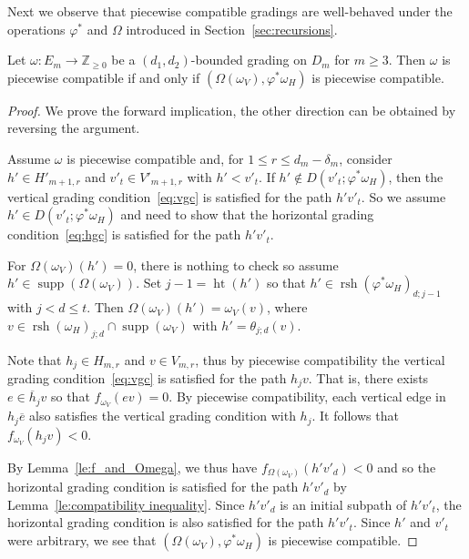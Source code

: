 \documentclass[ALCO,ThmDefs,Unicode,epreuves]{cedram}
\newcommand{\ZZ}{\mathbb{Z}}
\DeclareMathOperator{\hgt}{ht}
\DeclareMathOperator{\supp}{supp}
\DeclareMathOperator{\rsh}{rsh}
\begin{document}
Next we observe that piecewise compatible gradings are well-behaved under the operations $\varphi^*$ and $\Omega$ introduced in Section~\ref{sec:recursions}.
\begin{proposition}
 \label{prop:piecewise equivalence}
 Let $\omega:E_m\to\ZZ_{\ge0}$ be a $(d_1,d_2)$-bounded grading on $D_m$ for $m\ge3$. 
 Then $\omega$ is piecewise compatible if and only if $(\Omega(\omega_V),\varphi^*\omega_H)$ is piecewise compatible.
\end{proposition} 
\begin{proof}
 We prove the forward implication, the other direction can be obtained by reversing the argument. 

 Assume $\omega$ is piecewise compatible and, for $1\le r\le d_m-\delta_m$, consider $h'\in H'_{m+1,r}$ and $v'_t\in V'_{m+1,r}$ with $h'<v'_t$. 
 If $h'\notin D(v'_t;\varphi^*\omega_H)$, then the vertical grading condition~\eqref{eq:vgc} is satisfied for the path $h'v'_t$. 
 So we assume $h'\in D(v'_t;\varphi^*\omega_H)$ and need to show that the horizontal grading condition~\eqref{eq:hgc} is satisfied for the path $h'v'_t$.

 For $\Omega(\omega_V)(h')=0$, there is nothing to check so assume $h'\in\supp(\Omega(\omega_V))$.
 Set $j-1=\hgt(h')$ so that $h'\in\rsh(\varphi^*\omega_H)_{d;j-1}$ with $j<d\le t$.
 Then $\Omega(\omega_V)(h')=\omega_V(v)$, where $v\in\rsh(\omega_H)_{j;d}\cap\supp(\omega_V)$ with $h'=\theta_{j;d}(v)$.

 Note that $h_j\in H_{m,r}$ and $v\in V_{m,r}$, thus by piecewise compatibility the vertical grading condition~\eqref{eq:vgc} is satisfied for the path $h_jv$. 
 That is, there exists $e\in\overline{h}_jv$ so that $f_{\omega_V}(ev)=0$.
 By piecewise compatibility, each vertical edge in $h_j\overline{e}$ also satisfies the vertical grading condition with $h_j$.
 It follows that $f_{\omega_V}(h_jv)<0$.

 By Lemma~\ref{le:f_and_Omega}, we thus have $f_{\Omega(\omega_V)}(h'v'_d)<0$ and so the horizontal grading condition is satisfied for the path $h'v'_d$ by Lemma~\ref{le:compatibility inequality}.
 Since $h'v'_d$ is an initial subpath of $h'v'_t$, the horizontal grading condition is also satisfied for the path $h'v'_t$. 
 Since $h'$ and $v'_t$ were arbitrary, we see that $(\Omega(\omega_V),\varphi^*\omega_H)$ is piecewise compatible.
\end{proof} 
\end{document}
